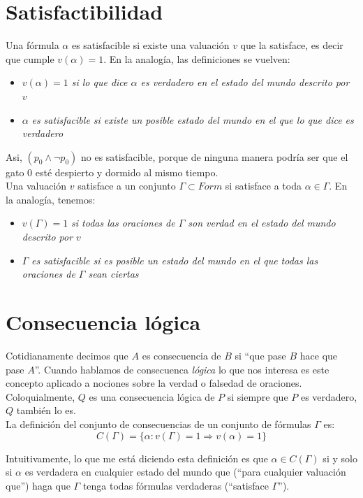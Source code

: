 \documentclass[10pt,a4paper]{article}
\newcommand{\G}{\Gamma}
\newcommand{\Ra}{\Rightarrow}
\renewcommand{\a}{\alpha}
\begin{document}
\section*{Satisfactibilidad}
Una fórmula $\a$ es satisfacible si existe una valuación $v$ que la satisface, es decir que cumple $v(\a) = 1$. En la analogía, las definiciones se vuelven:
\begin{itemize}
\item \textit{$v(\a) = 1$ si lo que dice $\a$ es verdadero en el estado del mundo descrito por $v$ } 
\item $\a$ \textit{es satisfacible si existe un posible estado del mundo en el que lo que dice es verdadero }
\end{itemize}

Asi, $(p_0 \land \neg p_0)$ no es satisfacible, porque de ninguna manera podría ser que el gato $0$ esté despierto y dormido al mismo tiempo. \\

Una valuación $v$ satisface a un conjunto $\G \subset Form$ si satisface a toda $\a \in \G$. En la analogía, tenemos:

\begin{itemize}
\item $v(\G) = 1$ \textit{si todas las oraciones de $\G$ son verdad en el estado del mundo descrito por $v$ } 
\item $\G$ \textit{es satisfacible si es posible un estado del mundo en el que todas las oraciones de $\G$ sean ciertas } 
\end{itemize}


\section*{Consecuencia lógica}
Cotidianamente decimos que $A$ es consecuencia de $B$ si ``que pase $B$ hace que pase $A$''. Cuando hablamos de consecuenca \textit{lógica} lo que nos interesa es este concepto aplicado a nociones sobre la verdad o falsedad de oraciones. Coloquialmente, $Q$ es una consecuencia lógica de $P$ si siempre que $P$ es verdadero, $Q$ también lo es.\\

La definición del conjunto de consecuencias de un conjunto de fórmulas $\G$ es: \[ C(\G) = \{ \a : v(\G) = 1 \Ra v(\a) = 1 \} \]

Intuitivamente, lo que me está diciendo esta definición es que $\a \in C(\G)$ si y solo si $\a$ es verdadera en cualquier estado del mundo que (``para cualquier valuación que'') haga que $\G$ tenga todas fórmulas verdaderas (``satisface $\G$''). \\
\end{document}
